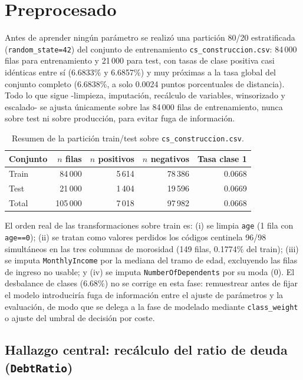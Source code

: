 \documentclass[11pt,a4paper]{article}
\begin{document}
\section{Preprocesado}

Antes de aprender ning\'un par\'ametro se realiz\'o una partici\'on 80/20 estratificada (\texttt{random\_state=42}) del conjunto de entrenamiento \texttt{cs\_construccion.csv}: 84\,000 filas para entrenamiento y 21\,000 para test, con tasas de clase positiva casi id\'enticas entre s\'i (6.6833\% y 6.6857\%) y muy pr\'oximas a la tasa global del conjunto completo (6.6838\%, a solo 0.0024 puntos porcentuales de distancia). Todo lo que sigue -limpieza, imputaci\'on, rec\'alculo de variables, winsorizado y escalado- se ajusta \'unicamente sobre las 84\,000 filas de entrenamiento, nunca sobre test ni sobre producci\'on, para evitar fuga de informaci\'on.

\begin{table}[H]
\centering
\caption{Resumen de la partici\'on train/test sobre \texttt{cs\_construccion.csv}.}
\label{tab:split_resumen}
\begin{tabular}{lrrrr}
\toprule
Conjunto & $n$ filas & $n$ positivos & $n$ negativos & Tasa clase 1 \\
\midrule
Train & 84\,000 & 5\,614 & 78\,386 & 0.0668 \\
Test  & 21\,000 & 1\,404 & 19\,596 & 0.0669 \\
Total & 105\,000 & 7\,018 & 97\,982 & 0.0668 \\
\bottomrule
\end{tabular}
\end{table}

El orden real de las transformaciones sobre train es: (i) se limpia \texttt{age} (1 fila con \texttt{age==0}); (ii) se tratan como valores perdidos los c\'odigos centinela 96/98 simult\'aneos en las tres columnas de morosidad (149 filas, 0.1774\% del train); (iii) se imputa \texttt{MonthlyIncome} por la mediana del tramo de edad, excluyendo las filas de ingreso no usable; y (iv) se imputa \texttt{NumberOfDependents} por su moda (0). El desbalance de clases (6.68\%) no se corrige en esta fase: remuestrear antes de fijar el modelo introducir\'ia fuga de informaci\'on entre el ajuste de par\'ametros y la evaluaci\'on, de modo que se delega a la fase de modelado mediante \texttt{class\_weight} o ajuste del umbral de decisi\'on por coste.

\subsection{Hallazgo central: rec\'alculo del ratio de deuda (\texttt{DebtRatio})}
\end{document}
